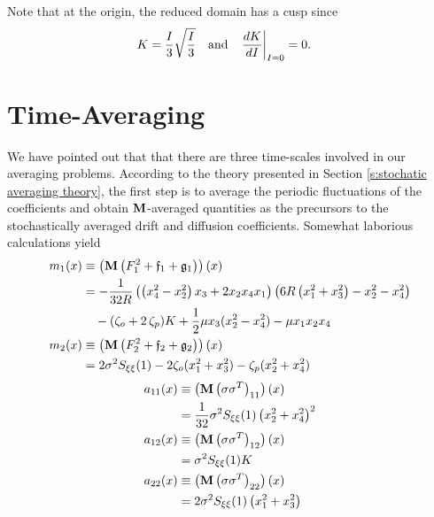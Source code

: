Note that at the origin, the reduced domain has a cusp since
\begin{align*}
K &= \frac{I}{3}\sqrt{\frac{I}{3}} & \text{and}&&\eval{\frac{dK}{dI}}_{I=0} &= 0.
\end{align*}

\section{Time-Averaging}
\label{S:T-Average}

We have pointed out that that there are three time-scales involved in our averaging problems. According to the theory presented in Section \ref{s:stochatic averaging theory}, the first step is to average the periodic fluctuations of the coefficients and obtain $\operatorname{\mathbf M}$-averaged quantities as the precursors to the stochastically averaged drift and diffusion coefficients. Somewhat laborious calculations yield
\begin{equation}
\begin{aligned}
m_1(x) &\equiv \left(\operatorname{\mathbf M} \left(F_1^2 + \mathfrak{f}_1 + \mathfrak{g}_1\right)\right)(x)\\
&=-\frac{1}{32R}\left( \left(x_4^2-x_2^2 \right)x_3+2 x_2x_4x_1\right)\left(6R\left( x_1^2+x_3^2 \right)-x_2^2-x_4^2\right) \\
&\quad -(\zeta_o+2\,\zeta_p) K +\frac12\mu x_3(x_2^2-x_4^2) - \mu x_1x_2x_4\\
m_2(x)&\equiv\left(\operatorname{\mathbf M} \left(F_2^2 + \mathfrak{f}_2 + \mathfrak{g}_2\right)\right)(x)\\
&= 2 \sigma^2S_{\xi\xi}(1) -2\zeta_o(x_1^2+x_3^2) - \zeta_p(x_2^2 + x_4^2)
\end{aligned}
\label{E:drift1}
\end{equation}
\begin{equation}
\begin{aligned}
a_{11}(x) &\equiv \left(\operatorname{\mathbf M} \left(\sigma\sigma^T\right)_{11}\right)(x)\\
&= \frac{1}{32}\sigma^2S_{\xi\xi}(1)\left(x_2^2 + x_4^2\right)^2\\
a_{12}(x) &\equiv \left(\operatorname{\mathbf M} \left(\sigma\sigma^T\right)_{12}\right)(x)\\
&= \sigma^2S_{\xi\xi}(1) K\\
a_{22}(x) &\equiv \left(\operatorname{\mathbf M} \left(\sigma\sigma^T\right)_{22}\right)(x)\\
&= 2\sigma^2S_{\xi\xi}(1)\left(x_1^2+x_3^2\right)
\end{aligned}
\label{E:diffusion1}
\end{equation}
